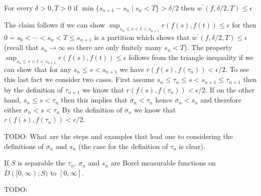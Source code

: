 \begin{clm}For every $\delta >0, T>0$ if $\min \lbrace s_{n+1} - s_n  \mid s_n < T \rbrace > \delta/2$ then 
$w^{\prime}(f, \delta/2, T)  \leq \epsilon$
\end{clm}
The claim follows if we can show $\sup_{s_n \leq s < t < s_{n+1}} r(f(s), f(t)) \leq \epsilon$ for then $0=s_0 < \dotsb < s_{n} < T \leq s_{n+1}$ is a partition which shows that
$w^{\prime}(f, \delta/2, T)  \leq \epsilon$ (recall that $s_n \to \infty$ so there are only finitely many $s_n < T$).
The property $\sup_{s_n \leq s < t < s_{n+1}} r(f(s), f(t)) \leq \epsilon$ follows from the triangle inequality if we can show that for any $s_n \leq s < s_{n+1}$ we have 
$r(f(s), f(\tau_n)) < \epsilon/2$.  To see this last fact we consider two cases.
First assume $s_n \leq \tau_n \leq s < s_{n+1} \leq \tau_{n+1}$ then by the definition of
$\tau_{n+1}$ we know that $r(f(s), f(\tau_n)) < \epsilon/2$.
If on the other hand, $s_n \leq s < \tau_n$ then this implies that $\sigma_n < \tau_n$ hence $\sigma_n < s_n$ and therefore either $\sigma_n < s < \tau_n$
By the definition of $\sigma_n$ we know that $r(f(s), f(\tau_n)) < \epsilon/2$.  

TODO: What are the steps and examples that lead one to considering the definitions of $\sigma_n$ and $s_n$ (the case for the definition of $\tau_n$ is clear).

\begin{clm}If $S$ is separable the $\tau_n$, $\sigma_n$ and $s_n$ are Borel measurable functions on $D([0,\infty); S)$ to $[0,\infty]$.
\end{clm}
TODO:

